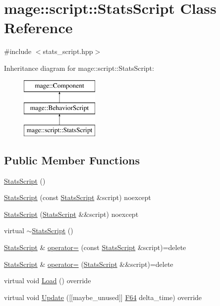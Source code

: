 \hypertarget{classmage_1_1script_1_1_stats_script}{}\section{mage\+:\+:script\+:\+:Stats\+Script Class Reference}
\label{classmage_1_1script_1_1_stats_script}


{\ttfamily \#include $<$stats\+\_\+script.\+hpp$>$}

Inheritance diagram for mage\+:\+:script\+:\+:Stats\+Script\+:\begin{figure}[H]
\begin{center}
\leavevmode
\includegraphics[height=3.000000cm]{classmage_1_1script_1_1_stats_script}
\end{center}
\end{figure}
\subsection*{Public Member Functions}
\begin{DoxyCompactItemize}
\item 
\hyperlink{classmage_1_1script_1_1_stats_script_a6863940cb48633fbd5fc56547dc72a76}{Stats\+Script} ()
\item 
\hyperlink{classmage_1_1script_1_1_stats_script_a3fb4aa69fc341df0fe2c2ad03f0ff278}{Stats\+Script} (const \hyperlink{classmage_1_1script_1_1_stats_script}{Stats\+Script} \&script) noexcept
\item 
\hyperlink{classmage_1_1script_1_1_stats_script_a9ac8ca59744a668504010b0f496f266f}{Stats\+Script} (\hyperlink{classmage_1_1script_1_1_stats_script}{Stats\+Script} \&\&script) noexcept
\item 
virtual \hyperlink{classmage_1_1script_1_1_stats_script_a5b9b30aa6939968c2aee8cdf11f6486c}{$\sim$\+Stats\+Script} ()
\item 
\hyperlink{classmage_1_1script_1_1_stats_script}{Stats\+Script} \& \hyperlink{classmage_1_1script_1_1_stats_script_ad33bbb402575b5abcb2639817d27b180}{operator=} (const \hyperlink{classmage_1_1script_1_1_stats_script}{Stats\+Script} \&script)=delete
\item 
\hyperlink{classmage_1_1script_1_1_stats_script}{Stats\+Script} \& \hyperlink{classmage_1_1script_1_1_stats_script_a5eecd80eef17414d566c7d7c77b3dbce}{operator=} (\hyperlink{classmage_1_1script_1_1_stats_script}{Stats\+Script} \&\&script)=delete
\item 
virtual void \hyperlink{classmage_1_1script_1_1_stats_script_aae0d11d30f1242d1f8d569b5b0894343}{Load} () override
\item 
virtual void \hyperlink{classmage_1_1script_1_1_stats_script_a0af94632cf9d5c32ae45799a2348c571}{Update} (\mbox{[}\mbox{[}maybe\+\_\+unused\mbox{]}\mbox{]} \hyperlink{namespacemage_ad26233bbec640deda836e572c1a23708}{F64} delta\+\_\+time) override
\end{DoxyCompactItemize}
